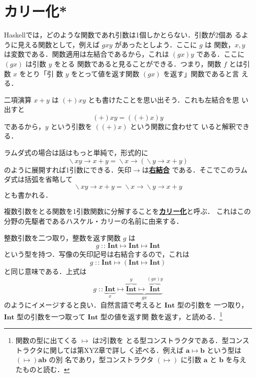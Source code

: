\documentclass[a5paper,twoside,fleqn,draft]{jsbook}
\newcommand{\programminglanguage}[1]{\textsf{#1}}
\newcommand{\haskell}{\programminglanguage{Haskell}}
\newcommand{\keyword}[1]{{\underline{\textbf{#1}}}}
\DeclareMathOperator{\mIn}{{:\!:}}
\DeclareMathOperator{\mLambda}{\backslash}
\DeclareMathOperator{\mLambdaArrow}{\rightarrow}
\DeclareMathOperator{\mMapsTo}{\mapsto}
\newcommand{\mType}[1]{\mathbf{#1}} %
\newcommand{\mA}{\mType{a}}
\newcommand{\mB}{\mType{b}}
\newcommand{\mIntType}{\mType{Int}}
\begin{document}
\section{カリー化*}

\haskell では，どのような関数であれ引数は1個しかとらない．引数が2個あ
るように見える関数として，例えば $gxy$ があったとしよう．ここに $g$ は
関数，$x,y$ は変数である．関数適用は左結合であるから，これは
$\left(gx\right)y$ である．ここに $\left(gx\right)$ は引数 $y$ をとる
関数であると見ることができる．つまり，関数 $f$ とは引数 $x$ をとり「引
  数 $y$ をとって値を返す関数 $\left(gx\right)$ を返す」関数であると言
える．

二項演算 $x+y$ は $(+)xy$ とも書けたことを思い出そう．これも左結合を思
い出すと
\begin{equation}
  (+)xy
  =\left((+)x\right)y
\end{equation}
であるから，$y$ という引数を $\left((+)x\right)$ という関数に食わせて
いると解釈できる．

ラムダ式の場合は話はもっと単純で，形式的に
\begin{equation}
  \mLambda xy\mLambdaArrow x+y
  =\mLambda x\mLambdaArrow\left(\mLambda y\mLambdaArrow x+y\right)
\end{equation}
のように展開すれば1引数にできる．矢印$\mLambdaArrow$は\keyword{右結合}
である．そこでこのラムダ式は括弧を省略して
\begin{equation}
  \mLambda xy\mLambdaArrow x+y
  =\mLambda x\mLambdaArrow\mLambda y\mLambdaArrow x+y
\end{equation}
とも書かれる．

複数引数をとる関数を1引数関数に分解することを\keyword{カリー化}と呼ぶ．
これはこの分野の先駆者であるハスケル・カリーの名前に由来する．


整数引数を二つ取り，整数を返す関数 $g$ は
\begin{equation}
  g
  \mIn\mIntType\mMapsTo\mIntType\mMapsTo\mIntType
\end{equation}
という型を持つ．写像の矢印記号は右結合するので，これは
\begin{equation}
  g
  \mIn\mIntType\mMapsTo(\mIntType\mMapsTo\mIntType)
\end{equation}
と同じ意味である．上式は
\begin{equation*}
  g
  \mIn\underbrace{\mIntType}_x
  \mMapsTo\underbrace{\overbrace{\mIntType}^y\mMapsTo\overbrace{\mIntType}^{(gx)y}}_{gx}
\end{equation*}
のようにイメージすると良い．自然言語で考えると $\mIntType$ 型の引数を
一つ取り，$\mIntType$ 型の引数を一つ取って $\mIntType$ 型の値を返す関
数を返す，と読める．\footnote{関数の型に出てくる $\mMapsTo$ は2引数を
  とる型コンストラクタである．型コンストラクタに関しては第XYZ章で詳し
  く述べる．例えば $\mA\mMapsTo\mB$ という型は $(\mMapsTo)\mA\mB$ の別
  名であり，型コンストラクタ $(\mMapsTo)$ に引数 $\mA$ と $\mB$ を与え
  たものと読む．}
\end{document}
